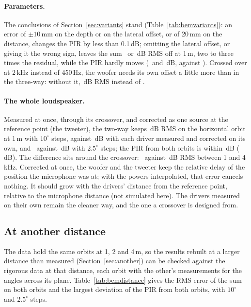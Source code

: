\documentclass[11pt,a4paper]{article}
\begin{document}
\paragraph{Parameters.} The conclusions of Section~\ref{sec:variants} stand (Table~\ref{tab:bemvariants}):
an error of $\pm10$\,mm on the depth or on the lateral offset, or of 20\,mm on the distance, changes the
PIR by less than 0.1\,dB; omitting the lateral offset, or giving it the wrong sign, leaves the sum
\bemSysLatZeroOne\ or \bemSysLatSignOne\,dB RMS off at 1\,m, two to three times the residual, while the
PIR hardly moves (\bemPirLatZeroOne\ and \bemPirLatSignOne\,dB, against \bemPirCorOne). Crossed over at
2\,kHz instead of 450\,Hz, the woofer needs its own offset a little more than in the three-way: without it,
\bemWfWfZeroOne\,dB RMS instead of \bemWfCorOne.

\paragraph{The whole loudspeaker.} Measured at once, through its crossover, and corrected as one source at
the reference point (the tweeter), the two-way keeps \bemSysWholeOne\,dB RMS on the horizontal orbit at 1\,m
with $10^\circ$ steps, against \bemSysCorOne\,dB with each driver measured and corrected on its own, and
\bemSysWholeFineOne\ against \bemSysFineOne\,dB with $2.5^\circ$ steps; the PIR from both orbits is within
\bemPirBothWholeOne\,dB (\bemPirBothCorOne\,dB). The difference sits around the crossover:
\bemSysXoWholeOne\ against \bemSysXoCorOne\,dB RMS between 1 and 4\,kHz. Corrected at once, the woofer and
the tweeter keep the relative delay of the position the microphone was at; with the powers interpolated, that
error cancels nothing. It should grow with the drivers' distance from the reference point, relative to the
microphone distance (not simulated here). The drivers measured on their own remain the cleaner way, and the
one a crossover is designed from.

\subsection{At another distance}
\label{sec:bemdistance}

The data hold the same orbits at 1, 2 and 4\,m, so the results rebuilt at a larger distance than measured
(Section~\ref{sec:another}) can be checked against the rigorous data at that distance, each orbit with the
other's measurements for the angles across its plane. Table~\ref{tab:bemdistance} gives the RMS error of
the sum on both orbits and the largest deviation of the PIR from both orbits, with $10^\circ$ and $2.5^\circ$
steps.
\end{document}
